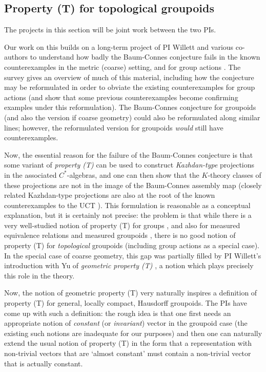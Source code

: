 \documentclass[11pt]{article}
\theoremstyle{plain}
\theoremstyle{definition}
\theoremstyle{remark}
\begin{document}
\subsection{Property (T) for topological groupoids}\label{dydim}

The projects in this section will be joint work between the two PIs.

Our work on this builds on a long-term project of PI Willett and various co-authors to understand how badly the Baum-Connes conjecture fails \cite{Higson:2002la} in the known counterexamples in the metric (coarse) setting, and for group actions \cite{Willett:2010ud,Willett:2010zh,Baum:2013kx,Buss:2014aa}.  The survey \cite{Baum:2015le} gives an overview of much of this material, including how the conjecture may be reformulated in order to obviate the existing counterexamples for group actions (and show that some previous counterexamples become confirming examples under this reformulation).  The Baum-Connes conjecture for groupoids (and also the version if coarse geometry) could also be reformulated along similar lines; however, the reformulated version for groupoids \emph{would} still have counterexamples.

Now, the essential reason for the failure of the Baum-Connes conjecture is that some variant of \emph{property (T)} can be used to construct \emph{Kazhdan-type} projections in the associated $C^*$-algebras, and one can then show that the $K$-theory classes of these projections are not in the image of the Baum-Connes assembly map (closely related Kazhdan-type projections are also at the root of the known counterexamples to the UCT \cite{Skandalis:1988rr}).  This formulation is reasonable as a conceptual explanation, but it is certainly not precise: the problem is that while there is a very well-studied notion of property (T) for groups \cite{Bekka:2000kx}, and also for measured equivalence relations and measured groupoids \cite{Anantharaman-Delaroche:2005pb}, there is no good notion of property (T) for \emph{topological} groupoids (including group actions as a special case).  In the special case of coarse geometry, this gap was partially filled by PI Willett's introduction with Yu of \emph{geometric property (T)} \cite{Willett:2013cr}, a notion which plays precisely this role in the theory.

Now, the notion of geometric property (T) very naturally inspires a definition of property (T) for general, locally compact, Hausdorff groupoids.   The PIs have come up with such a definition: the rough idea is that one first needs an appropriate notion of \emph{constant} (or \emph{invariant}) vector in the groupoid case (the existing such notions are inadequate for our purposes) and then one can naturally extend the usual notion of property (T) in the form that a representation with non-trivial vectors that are `almost constant' must contain a non-trivial vector that is actually constant.
\end{document}

